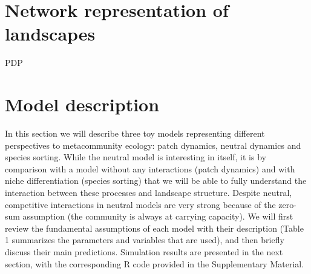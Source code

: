 \documentclass[12pt]{article}
\begin{document}
\section*{Network representation of landscapes}

PDP

 


 

\section*{Model description}

In this section we will describe three toy models representing different perspectives to metacommunity ecology: patch dynamics, neutral dynamics and species sorting. While the neutral model is interesting in itself, it is by comparison with a model without any interactions (patch dynamics) and with niche differentiation (species sorting) that we will be able to fully understand the interaction between these processes and landscape structure. Despite neutral, competitive interactions in neutral models are very strong because of the zero-sum assumption (the community is always at carrying capacity). We will first review the fundamental assumptions of each model with their description (Table 1 summarizes the parameters and variables that are used), and then briefly discuss their main predictions. Simulation results are presented in the next section, with the corresponding R code provided in the Supplementary Material.
\end{document}
